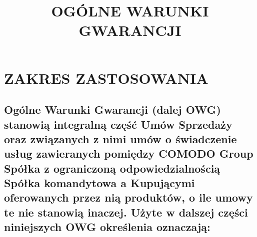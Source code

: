 \documentclass[10pt,a4paper]{article}
\title{OGÓLNE WARUNKI GWARANCJI} %
\author{}
\date{}
\begin{document}
	\maketitle

	\section{ZAKRES ZASTOSOWANIA}

	\subsection{Ogólne Warunki Gwarancji (dalej OWG) stanowią integralną część Umów Sprzedaży oraz związanych z nimi umów o świadczenie
usług zawieranych pomiędzy COMODO Group Spółka z ograniczoną odpowiedzialnością Spółka komandytowa a Kupującymi
oferowanych przez nią produktów, o ile umowy te nie stanowią inaczej. Użyte w dalszej części niniejszych OWG określenia oznaczają:}
\end{document}
